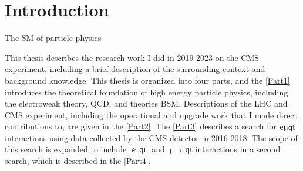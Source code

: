 \chapter{Introduction}
\label{chap:Introduction}

The \ac{SM} of particle physics 



This thesis describes the research work I did in 2019-2023 on the \ac{CMS} experiment, including a brief description of the surrounding context and background knowledge. This thesis is organized into four parts, and the \autoref{Part1} introduces the theoretical foundation of high energy particle physics, including the electroweak theory, \ac{QCD}, and theories \ac{BSM}. Descriptions of the \ac{LHC} and {CMS} experiment, including the operational and upgrade work that I made direct contributions to, are given in the \autoref{Part2}. The \autoref{Part3} describes a search for $\textsf{e}\upmu\textsf{{q}t}$ interactions using data collected by the \ac{CMS} detector in 2016-2018. The scope of this search is expanded to include $\textsf{e}\uptau\textsf{qt}$ and $\upmu\uptau\textsf{qt}$ interactions in a second search, which is described in the \autoref{Part4}.




